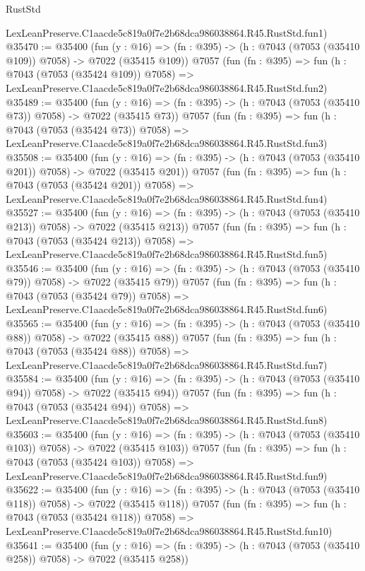 \begin{lexlean}{RustStd}
\begin{coremodule}
    LexLeanPreserve.C1aacde5c819a0f7e2b68dca986038864.R45.RustStd.fun1)
@35470 := @35400
    (fun (y : @16) => (fn : @395) -> (h : @7043 (@7053 (@35410 @109)) @7058) -> @7022 (@35415 @109))
    @7057
    (fun (fn : @395) =>
    fun (h : @7043 (@7053 (@35424 @109)) @7058) =>
    LexLeanPreserve.C1aacde5c819a0f7e2b68dca986038864.R45.RustStd.fun2)
@35489 := @35400
    (fun (y : @16) => (fn : @395) -> (h : @7043 (@7053 (@35410 @73)) @7058) -> @7022 (@35415 @73))
    @7057
    (fun (fn : @395) =>
    fun (h : @7043 (@7053 (@35424 @73)) @7058) =>
    LexLeanPreserve.C1aacde5c819a0f7e2b68dca986038864.R45.RustStd.fun3)
@35508 := @35400
    (fun (y : @16) => (fn : @395) -> (h : @7043 (@7053 (@35410 @201)) @7058) -> @7022 (@35415 @201))
    @7057
    (fun (fn : @395) =>
    fun (h : @7043 (@7053 (@35424 @201)) @7058) =>
    LexLeanPreserve.C1aacde5c819a0f7e2b68dca986038864.R45.RustStd.fun4)
@35527 := @35400
    (fun (y : @16) => (fn : @395) -> (h : @7043 (@7053 (@35410 @213)) @7058) -> @7022 (@35415 @213))
    @7057
    (fun (fn : @395) =>
    fun (h : @7043 (@7053 (@35424 @213)) @7058) =>
    LexLeanPreserve.C1aacde5c819a0f7e2b68dca986038864.R45.RustStd.fun5)
@35546 := @35400
    (fun (y : @16) => (fn : @395) -> (h : @7043 (@7053 (@35410 @79)) @7058) -> @7022 (@35415 @79))
    @7057
    (fun (fn : @395) =>
    fun (h : @7043 (@7053 (@35424 @79)) @7058) =>
    LexLeanPreserve.C1aacde5c819a0f7e2b68dca986038864.R45.RustStd.fun6)
@35565 := @35400
    (fun (y : @16) => (fn : @395) -> (h : @7043 (@7053 (@35410 @88)) @7058) -> @7022 (@35415 @88))
    @7057
    (fun (fn : @395) =>
    fun (h : @7043 (@7053 (@35424 @88)) @7058) =>
    LexLeanPreserve.C1aacde5c819a0f7e2b68dca986038864.R45.RustStd.fun7)
@35584 := @35400
    (fun (y : @16) => (fn : @395) -> (h : @7043 (@7053 (@35410 @94)) @7058) -> @7022 (@35415 @94))
    @7057
    (fun (fn : @395) =>
    fun (h : @7043 (@7053 (@35424 @94)) @7058) =>
    LexLeanPreserve.C1aacde5c819a0f7e2b68dca986038864.R45.RustStd.fun8)
@35603 := @35400
    (fun (y : @16) => (fn : @395) -> (h : @7043 (@7053 (@35410 @103)) @7058) -> @7022 (@35415 @103))
    @7057
    (fun (fn : @395) =>
    fun (h : @7043 (@7053 (@35424 @103)) @7058) =>
    LexLeanPreserve.C1aacde5c819a0f7e2b68dca986038864.R45.RustStd.fun9)
@35622 := @35400
    (fun (y : @16) => (fn : @395) -> (h : @7043 (@7053 (@35410 @118)) @7058) -> @7022 (@35415 @118))
    @7057
    (fun (fn : @395) =>
    fun (h : @7043 (@7053 (@35424 @118)) @7058) =>
    LexLeanPreserve.C1aacde5c819a0f7e2b68dca986038864.R45.RustStd.fun10)
@35641 := @35400
    (fun (y : @16) => (fn : @395) -> (h : @7043 (@7053 (@35410 @258)) @7058) -> @7022 (@35415 @258))

\end{coremodule}
\end{lexlean}
